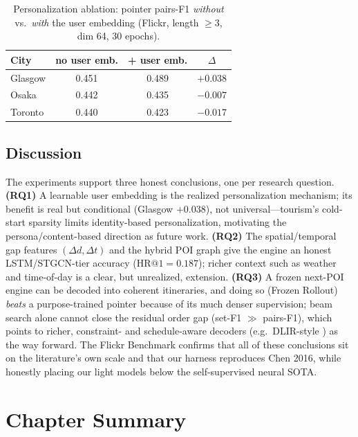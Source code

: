 \begin{table}[ht]
\centering
\caption{Personalization ablation: pointer pairs-F1 \emph{without} vs.\ \emph{with} the user
embedding (Flickr, length $\ge 3$, dim 64, 30 epochs).}
\label{tab:pers}
\begin{tabular}{lccc}
\toprule
City & no user emb. & + user emb. & $\Delta$ \\
\midrule
Glasgow & 0.451 & 0.489 & $+0.038$ \\
Osaka   & 0.442 & 0.435 & $-0.007$ \\
Toronto & 0.440 & 0.423 & $-0.017$ \\
\bottomrule
\end{tabular}
\end{table}

\subsection{Discussion}
\label{sec:sol-results-discussion}

The experiments support three honest conclusions, one per research question.
\textbf{(RQ1)} A learnable user embedding is the realized personalization mechanism; its benefit
is real but conditional (Glasgow $+0.038$), not universal---tourism's cold-start sparsity limits
identity-based personalization, motivating the persona/content-based direction as future work.
\textbf{(RQ2)} The spatial/temporal gap features $(\Delta d,\Delta t)$ and the hybrid POI graph
give the engine an honest LSTM/STGCN-tier accuracy ($\mathrm{HR@}1=0.187$); richer context such
as weather and time-of-day is a clear, but unrealized, extension.
\textbf{(RQ3)} A frozen next-POI engine can be decoded into coherent itineraries, and doing so
(Frozen Rollout) \emph{beats} a purpose-trained pointer because of its much denser supervision;
beam search alone cannot close the residual order gap (set-F1 $\gg$ pairs-F1), which points to
richer, constraint- and schedule-aware decoders (e.g.\ DLIR-style \cite{halder2025drlir}) as the
way forward. The Flickr Benchmark confirms that all of these conclusions sit on the literature's
own scale and that our harness reproduces Chen 2016, while honestly placing our light models
below the self-supervised neural SOTA.

\section{Chapter Summary}
\label{sec:sol-summary}

